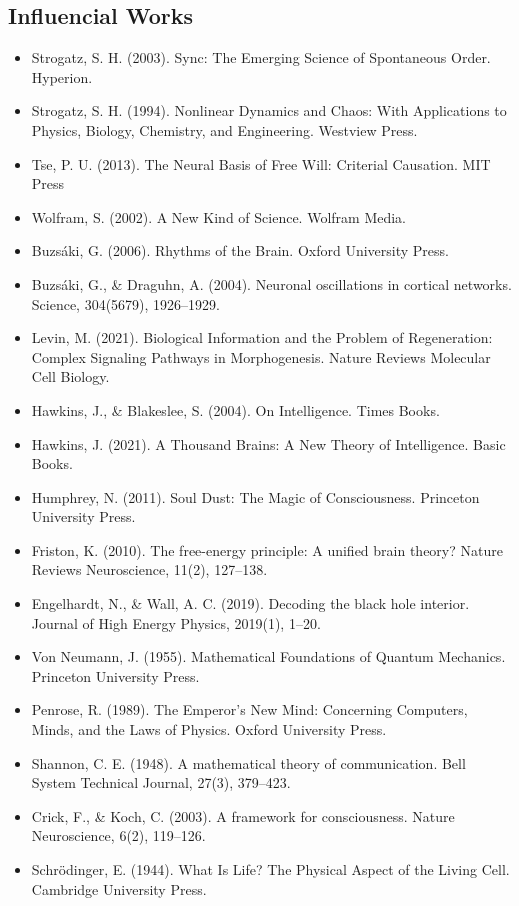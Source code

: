 \documentclass[american,11pt,letterpaper]{article}
\begin{document}
\subsection{Influencial Works}
\begin{itemize}
\item Strogatz, S. H. (2003). Sync: The Emerging Science of Spontaneous Order. Hyperion.
\item Strogatz, S. H. (1994). Nonlinear Dynamics and Chaos: With Applications to Physics, Biology, Chemistry, and Engineering. Westview Press.
\item Tse, P. U. (2013). The Neural Basis of Free Will: Criterial Causation. MIT Press
\item Wolfram, S. (2002). A New Kind of Science. Wolfram Media.
\item Buzs\'aki, G. (2006). Rhythms of the Brain. Oxford University Press.
\item Buzs\'aki, G., \& Draguhn, A. (2004). Neuronal oscillations in cortical networks. Science, 304(5679), 1926--1929.
\item Levin, M. (2021). Biological Information and the Problem of Regeneration: Complex Signaling Pathways in Morphogenesis. Nature Reviews Molecular Cell Biology.
\item Hawkins, J., \& Blakeslee, S. (2004). On Intelligence. Times Books.
\item Hawkins, J. (2021). A Thousand Brains: A New Theory of Intelligence. Basic Books.
\item Humphrey, N. (2011). Soul Dust: The Magic of Consciousness. Princeton University Press.
\item Friston, K. (2010). The free-energy principle: A unified brain theory? Nature Reviews Neuroscience, 11(2), 127--138.
\item Engelhardt, N., \& Wall, A. C. (2019). Decoding the black hole interior. Journal of High Energy Physics, 2019(1), 1--20.
\item Von Neumann, J. (1955). Mathematical Foundations of Quantum Mechanics. Princeton University Press.
\item Penrose, R. (1989). The Emperor's New Mind: Concerning Computers, Minds, and the Laws of Physics. Oxford University Press.
\item Shannon, C. E. (1948). A mathematical theory of communication. Bell System Technical Journal, 27(3), 379--423.
\item Crick, F., \& Koch, C. (2003). A framework for consciousness. Nature Neuroscience, 6(2), 119--126.
\item Schr\"odinger, E. (1944). What Is Life? The Physical Aspect of the Living Cell. Cambridge University Press.

\end{itemize}
\end{document}
